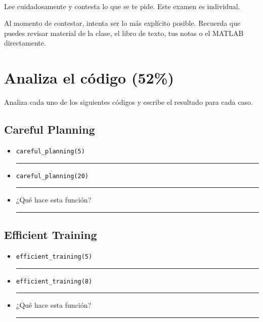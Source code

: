 \documentclass[11pt]{article}
\title{
    \myclass \\
    \textbf{\mytitle} \\
    \myheader
    \date{}
}
\newcommand{\matlab}[1]{\lstinline[style=Matlab-bw]!#1!}
\newcommand{\shortresponserule}{{\large\rule{5 cm}{0.3mm}}}
\newcommand{\responserule}{{\large\rule{10 cm}{0.3mm}}}
\begin{document}
\maketitle

\vspace{-1.5cm}

Lee cuidadosamente y contesta lo que se te pide.
Este examen es individual.

Al momento de contestar, intenta ser lo más explícito posible. %
Recuerda que puedes revisar material de la clase, el libro de texto, tus notas o el MATLAB directamente.

\section{Analiza el código (52\%)}

Analiza cada uno de los siguientes códigos y escribe el resultado para cada caso.

\subsection*{Careful Planning}



\begin{itemize}
    \item \matlab{careful_planning(5)} \hfill \shortresponserule
    \item \matlab{careful_planning(20)} \hfill \shortresponserule
    \item ¿Qué hace esta función? \hfill \responserule
\end{itemize}

\subsection*{Efficient Training}



\begin{itemize}
    \item \matlab{efficient_training(5)} \hfill \shortresponserule
    \item \matlab{efficient_training(8)} \hfill \shortresponserule
    \item ¿Qué hace esta función? \hfill \responserule
\end{itemize}
\end{document}
